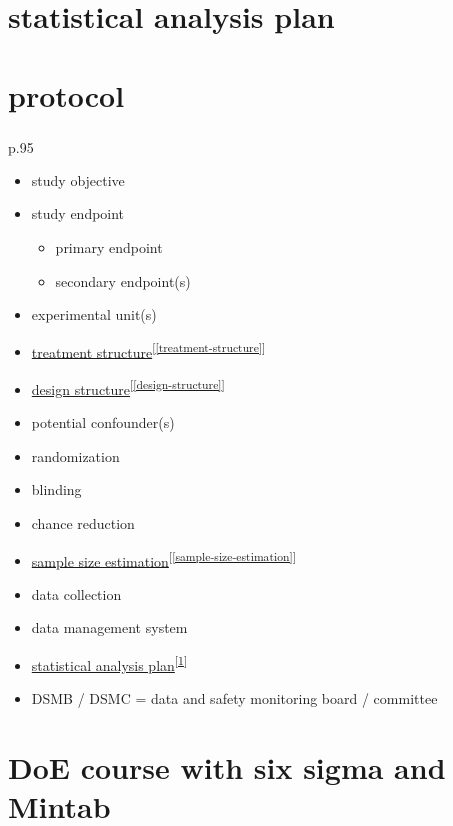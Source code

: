 \documentclass[
]{book}
\providecommand{\tightlist}{%
  \setlength{\itemsep}{0pt}\setlength{\parskip}{0pt}}
\theoremstyle{definition}
\theoremstyle{definition}
\theoremstyle{definition}
\theoremstyle{definition}
\theoremstyle{remark}
\begin{document}
\section{statistical analysis plan}\label{statistical-analysis-plan}

\section{protocol}\label{protocol}

\textsuperscript{} p.95

\begin{itemize}
\tightlist
\item
  study objective
\item
  study endpoint

  \begin{itemize}
  \tightlist
  \item
    primary endpoint
  \item
    secondary endpoint(s)
  \end{itemize}
\item
  experimental unit(s)
\item
  \hyperref[treatment-structure]{treatment structure}\textsuperscript{{[}\ref{treatment-structure}{]}}
\item
  \hyperref[design-structure]{design structure}\textsuperscript{{[}\ref{design-structure}{]}}
\item
  potential confounder(s)
\item
  randomization
\item
  blinding
\item
  chance reduction
\item
  \hyperref[sample-size-estimation]{sample size estimation}\textsuperscript{{[}\ref{sample-size-estimation}{]}}
\item
  data collection
\item
  data management system
\item
  \hyperref[statistical-analysis-plan]{statistical analysis plan}\textsuperscript{{[}\ref{statistical-analysis-plan}{]}}
\item
  DSMB / DSMC = data and safety monitoring board / committee
\end{itemize}

\section{DoE course with six sigma and Mintab}\label{doe-course-with-six-sigma-and-mintab}
\end{document}
